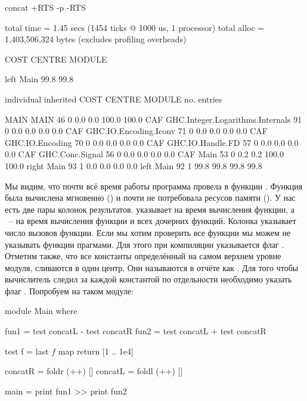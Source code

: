 \begin{code}
	   concat +RTS -p -RTS

	total time  =        1.45 secs   (1454 ticks @ 1000 us, 1 processor)
	total alloc = 1,403,506,324 bytes  (excludes profiling overheads)

COST CENTRE MODULE  %

left        Main     99.8   99.8


                                                                 individual     inherited
COST CENTRE MODULE                             no.   entries  %

MAIN        MAIN                                46         0    0.0    0.0   100.0  100.0
 CAF        GHC.Integer.Logarithms.Internals    91         0    0.0    0.0     0.0    0.0
 CAF        GHC.IO.Encoding.Iconv               71         0    0.0    0.0     0.0    0.0
 CAF        GHC.IO.Encoding                     70         0    0.0    0.0     0.0    0.0
 CAF        GHC.IO.Handle.FD                    57         0    0.0    0.0     0.0    0.0
 CAF        GHC.Conc.Signal                     56         0    0.0    0.0     0.0    0.0
 CAF        Main                                53         0    0.2    0.2   100.0  100.0
  right     Main                                93         1    0.0    0.0     0.0    0.0
  left      Main                                92         1   99.8   99.8    99.8   99.8
\end{code}
  
Мы видим, что почти всё время работы программа провела в функции
. Функция  была вычислена мгновенно () и
почти не потребовала ресусов памяти (). У нас есть две пары 
колонок результатов.  указывает на время вычисления функции,
а ~-- на время вычисления функции и всех дочерних функций.
Колонка  указывает число вызовов функции. 
Если мы хотим проверить все функции мы можем не указывать функции
прагмами. Для этого при компиляции указывается флаг .
Отметим также, что все константы определённый на самом верхнем уровне
модуля, сливаются в один центр. Они называются в отчёте как .
Для того чтобы вычислитель следил за каждой константой по отдельности
необходимо указать флаг . Попробуем на таком модуле:

\begin{code}
module Main where

fun1 = test concatL - test concatR
fun2 = test concatL + test concatR

test f = last $ f $ map return [1 .. 1e4]

concatR = foldr (++) [] 
concatL = foldl (++) [] 

main = print fun1 >> print fun2
\end{code}
  
